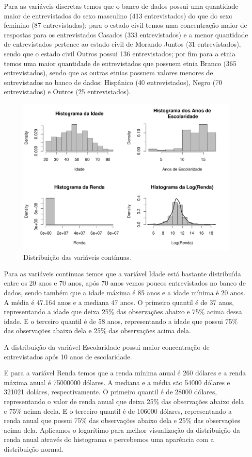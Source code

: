 \documentclass[]{article}
\begin{document}
Para as variáveis discretas temos que o banco de dados possui uma
quantidade maior de entrevistados do sexo masculino (413 entrevistados)
do que do sexo feminino (87 entrevistadas); para o estado civil temos
uma concentração maior de respostas para os entrevistados Casados (333
entrevistados) e a menor quantidade de entrevistados pertence ao estado
civil de Morando Juntos (31 entrevistados), sendo que o estado civil
Outros possui 136 entrevistados; por fim para a etnia temos uma maior
quantidade de entrevistados que possuem etnia Branco (365
entrevistados), sendo que as outras etnias possuem valores menores de
entrevistados no banco de dados: Hispânico (40 entrevistados), Negro (70
entrevistados) e Outros (25 entrevistados).

\begin{figure}[H]

{\centering \includegraphics[width=0.6\linewidth]{p101-graf} 

}

\caption{Distribuição das variáveis contínuas.}\label{fig:unnamed-chunk-7}
\end{figure}

Para as variáveis contínuas temos que a variável Idade está bastante
distribuída entre os 20 anos e 70 anos, após 70 anos vemos poucos
entrevistados no banco de dados, sendo também que a idade máxima é 85
anos e a idade mínima é 20 anos. A média é 47.164 anos e a mediana 47
anos. O primeiro quantil é de 37 anos, representando a idade que deixa
25\% das observações abaixo e 75\% acima dessa idade. E o terceiro
quantil é de 58 anos, representando a idade que possui 75\% das
observações abaixo dela e 25\% das observações acima dela.

A distribuição da variável Escolaridade possui maior concentração de
entrevistados após 10 anos de escolaridade.

E para a variável Renda temos que a renda mínima anual é 260 dólares e a
renda máxima anual é 75000000 dólares. A mediana e a média são 54000
dólares e 321021 doláres, respectivamente. O primeiro quantil é de 28000
dólares, representando o valor de renda anual que deixa 25\% das
observações abaixo dela e 75\% acima deela. E o terceiro quantil é de
106000 dólares, representando a renda anual que possui 75\% das
observações abaixo dela e 25\% das observações acima dela. Aplicamos o
logarítimo para melhor visualização da distribuição da renda anual
através do histograma e percebemos uma aparência com a distribuição
normal.
\end{document}

